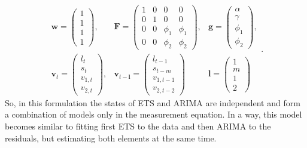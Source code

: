 \documentclass[]{book}
\theoremstyle{definition}
\theoremstyle{definition}
\theoremstyle{definition}
\theoremstyle{definition}
\theoremstyle{remark}
\begin{document}
\begin{equation}
  \begin{aligned}
    \mathbf{w} = \begin{pmatrix} 1 \\ 1 \\ 1 \\ 1 \end{pmatrix}, & \mathbf{F} = \begin{pmatrix} 1 & 0 & 0 & 0 \\ 0 & 1 & 0 & 0 \\ 0 & 0 & \phi_1 & \phi_1 \\ 0 & 0 & \phi_2 & \phi_2 \end{pmatrix}, & \mathbf{g} = \begin{pmatrix} \alpha \\ \gamma \\ \phi_1 \\ \phi_2 \end{pmatrix}, \\
    \mathbf{v}_{t} = \begin{pmatrix} l_t \\ s_t \\ v_{1,t} \\ v_{2,t} \end{pmatrix}, & \mathbf{v}_{t-\mathbf{l}} = \begin{pmatrix} l_{t-1} \\ s_{t-m} \\ v_{1,t-1} \\ v_{2,t-2} \end{pmatrix} & \mathbf{l} = \begin{pmatrix} 1 \\ m \\ 1 \\ 2\end{pmatrix}
  \end{aligned}.
  \label{eq:ADAMETSARIMAANN100Matrices}
\end{equation}
So, in this formulation the states of ETS and ARIMA are independent and form a combination of models only in the measurement equation. In a way, this model becomes similar to fitting first ETS to the data and then ARIMA to the residuals, but estimating both elements at the same time.
\end{document}
